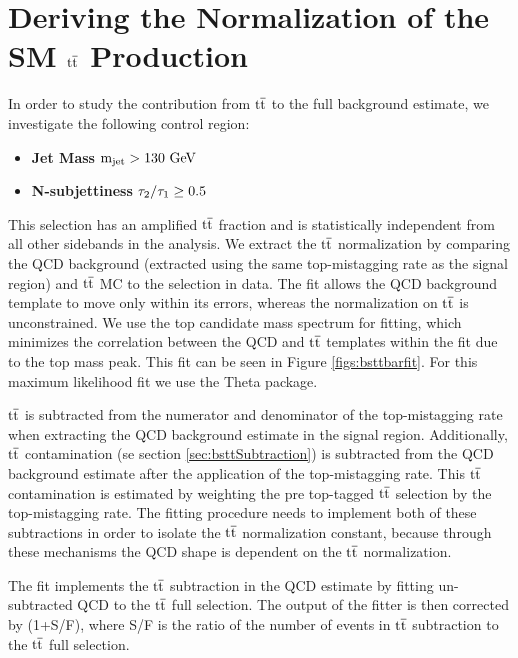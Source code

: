 \section{Deriving the Normalization of the SM $\mathrm{t\overline{t}}$ Production}
\label{sec:bsttbarsideband}
In order to study the contribution from $\mathrm{t\overline{t}}$ to the full background estimate, 
we investigate the following control region:
\begin{itemize}
\item {\bf Jet Mass}   $\mathrm{m_{\text{jet}} > 130~\mathrm{GeV}}$ 
\item {\bf N-subjettiness} $\mathrm{\boldmath \tau_2/\tau_1 \geq 0.5}$ 
\end{itemize}
This selection has an amplified $\mathrm{t\overline{t}}$ fraction and is statistically independent from all other sidebands in the analysis.    
We extract the $\mathrm{t\overline{t}}$ normalization by comparing the QCD background (extracted using the same top-mistagging rate as the signal region) and $\mathrm{t\overline{t}}$ MC to the selection in data.
The fit allows the QCD background template to move only within its errors, whereas the normalization on $\mathrm{t\overline{t}}$ is unconstrained. 
We use the top candidate mass spectrum for fitting, which minimizes the correlation between the 
QCD and $\mathrm{t\overline{t}}$ templates within the fit due to the top mass peak. This fit can be seen in Figure \ref{figs:bsttbarfit}.  For this maximum likelihood fit we use the Theta package.

$\mathrm{t\overline{t}}$ is subtracted from the numerator and denominator of the top-mistagging rate when extracting the QCD background estimate in the signal region.  
Additionally, $\mathrm{t\overline{t}}$ contamination (se section \ref{sec:bsttSubtraction}) is subtracted from the QCD background estimate after the application of the top-mistagging rate.  
This $\mathrm{t\overline{t}}$ contamination is estimated by weighting the pre top-tagged $\mathrm{t\overline{t}}$ selection by the top-mistagging rate.  The fitting procedure needs to implement both of these subtractions 
in order to isolate the $\mathrm{t\overline{t}}$ normalization constant, because through these mechanisms the QCD shape is dependent on the $\mathrm{t\overline{t}}$ normalization.

The fit implements the $\mathrm{t\overline{t}}$ subtraction in the QCD estimate by fitting un-subtracted QCD to the $\mathrm{t\overline{t}}$ full selection.  
The output of the fitter is then corrected by  
(1+S/F), where S/F is the ratio of the number of events in $\mathrm{t\overline{t}}$ subtraction to the $\mathrm{t\overline{t}}$ full selection. 


